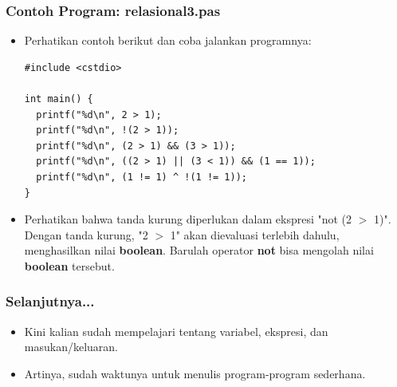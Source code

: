 \begin{frame}[fragile]
\frametitle{Contoh Program: relasional3.pas}
\begin{itemize}
  \item Perhatikan contoh berikut dan coba jalankan programnya:
\begin{lstlisting}
#include <cstdio>

int main() {
  printf("%d\n", 2 > 1);
  printf("%d\n", !(2 > 1));
  printf("%d\n", (2 > 1) && (3 > 1));
  printf("%d\n", ((2 > 1) || (3 < 1)) && (1 == 1));
  printf("%d\n", (1 != 1) ^ !(1 != 1));
}\end{lstlisting}
  \item Perhatikan bahwa tanda kurung diperlukan dalam ekspresi "not (2 $>$ 1)". Dengan tanda kurung, "2 $>$ 1" akan dievaluasi terlebih dahulu, menghasilkan nilai \textbf{boolean}. Barulah operator \textbf{not} bisa mengolah nilai \textbf{boolean} tersebut.
\end{itemize}
\end{frame}

\begin{frame}
\frametitle{Selanjutnya...}
\begin{itemize}
  \item Kini kalian sudah mempelajari tentang variabel, ekspresi, dan masukan/keluaran.
  \item Artinya, sudah waktunya untuk menulis program-program sederhana.
\end{itemize}
\end{frame}


